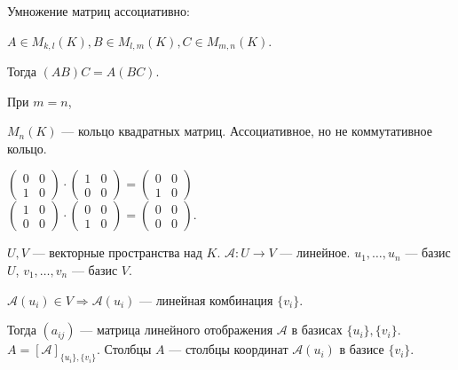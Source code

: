 \begin{consequence}
    Умножение матриц ассоциативно:

    $A \in M_{k, l}(K), B \in M_{l, m}(K), C \in M_{m, n}(K)$.

    Тогда $(AB)C = A(BC)$.
\end{consequence}
\begin{definition}
    При $m = n$,

    $M_n(K)$ --- кольцо квадратных матриц. Ассоциативное, но не коммутативное кольцо.
\end{definition}
\begin{example}
    $\begin{pmatrix} 0 & 0 \\ 1 & 0 \end{pmatrix} \cdot \begin{pmatrix} 1 & 0 \\ 0 & 0 \end{pmatrix} = \begin{pmatrix} 0 & 0 \\ 1 & 0 \end{pmatrix}$\\
    $\begin{pmatrix} 1 & 0 \\ 0 & 0 \end{pmatrix} \cdot \begin{pmatrix} 0 & 0 \\ 1 & 0 \end{pmatrix} = \begin{pmatrix} 0 & 0 \\ 0 & 0 \end{pmatrix}$.
\end{example}

$U, V$ --- векторные пространства над  $K$.  $\mathcal{A}\!: U \to V$ --- линейное.  $u_1, \ldots, u_n$ --- базис $U$,  $v_1, \ldots, v_n$ --- базис $V$. 

$\mathcal{A}(u_i) \in V \Rightarrow \mathcal{A}(u_i)$ --- линейная комбинация  $\{ v_i \}$.

Тогда  $(a_{ij})$ --- матрица линейного отображения  $\mathcal{A}$ в базисах  $\{u_i\}, \{v_i\}$.  $A = [ \mathcal{A}]_{\{u_i\}, \{v_i\}}$. Столбцы  $A$ --- столбцы координат  $\mathcal{A}(u_i)$ в базисе  $\{v_i\}$.

